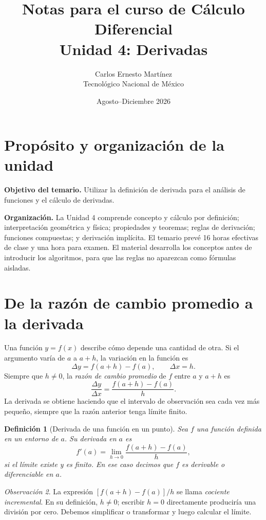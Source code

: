 \documentclass[12pt]{article}
\title{\textbf{Notas para el curso de Cálculo Diferencial}\\[0.35cm]
\Large Unidad 4: Derivadas}
\author{Carlos Ernesto Martínez\\Tecnológico Nacional de México}
\date{Agosto--Diciembre 2026}
\newtheorem{definicion}{Definición}[section]
\theoremstyle{remark}
\newtheorem{observacion}[definicion]{Observación}
\begin{document}
\maketitle
\tableofcontents
\newpage
\section*{Propósito y organización de la unidad}
\textbf{Objetivo del temario.} Utilizar la definición de derivada para el análisis de funciones y el cálculo de derivadas.

\textbf{Organización.} La Unidad 4 comprende concepto y cálculo por definición; interpretación geométrica y física; propiedades y teoremas; reglas de derivación; funciones compuestas; y derivación implícita. El temario prevé 16 horas efectivas de clase y una hora para examen. El material desarrolla los conceptos antes de introducir los algoritmos, para que las reglas no aparezcan como fórmulas aisladas.

\section{De la razón de cambio promedio a la derivada}
Una función $y=f(x)$ describe cómo depende una cantidad de otra. Si el argumento varía de $a$ a $a+h$, la variación en la función es
\[
\Delta y=f(a+h)-f(a),\qquad \Delta x=h.
\]
Siempre que $h\ne0$, la \emph{razón de cambio promedio} de $f$ entre $a$ y $a+h$ es
\[
\frac{\Delta y}{\Delta x}=\frac{f(a+h)-f(a)}{h}.
\]
La derivada se obtiene haciendo que el intervalo de observación sea cada vez más pequeño, siempre que la razón anterior tenga límite finito.

\begin{definicion}[Derivada de una función en un punto]
Sea $f$ una función definida en un entorno de $a$. Su derivada en $a$ es
\[
\boxed{f'(a)=\lim_{h\to0}\frac{f(a+h)-f(a)}{h},}
\]
si el límite existe y es finito. En ese caso decimos que $f$ es \emph{derivable} o \emph{diferenciable} en $a$.
\end{definicion}

\begin{observacion}
La expresión $[f(a+h)-f(a)]/h$ se llama \emph{cociente incremental}. En su definición, $h\ne0$; escribir $h=0$ directamente produciría una división por cero. Debemos simplificar o transformar y luego calcular el límite.
\end{observacion}
\end{document}
